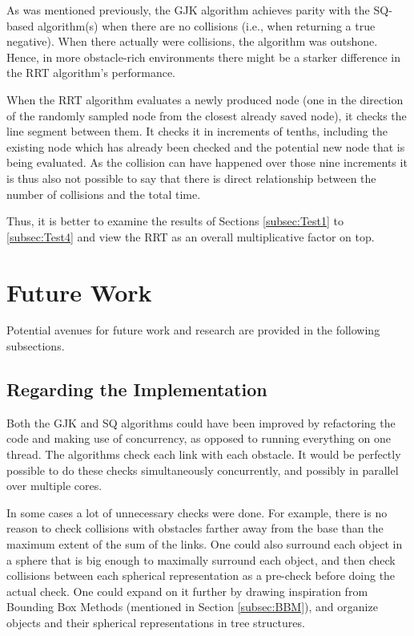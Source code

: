 As was mentioned previously, the \gls{GJK} algorithm achieves parity with the \gls{SQ}-based algorithm(s) when there are no collisions (i.e., when returning a true negative). When there actually were collisions, the algorithm was outshone. Hence, in more obstacle-rich environments there might be a starker difference in the \gls{RRT} algorithm's performance.

When the \gls{RRT} algorithm evaluates a newly produced node (one in the direction of the randomly sampled node from the closest already saved node), it checks the line segment between them. It checks it in increments of tenths, including the existing node which has already been checked and the potential new node that is being evaluated. As the collision can have happened over those nine increments it is thus also not possible to say that there is direct relationship between the number of collisions and the total time.

Thus, it is better to examine the results of Sections \ref{subsec:Test1} to \ref{subsec:Test4} and view the \gls{RRT} as an overall multiplicative factor on top. 
 

\section{Future Work}%

Potential avenues for future work and research are provided in the following subsections.

\subsection{Regarding the Implementation}

Both the \gls{GJK} and \gls{SQ} algorithms could have been improved by refactoring the code and making use of concurrency, as opposed to running everything on one thread. The algorithms check each link with each obstacle. It would be perfectly possible to do these checks simultaneously concurrently, and possibly in parallel over multiple cores.

In some cases a lot of unnecessary checks were done. For example, there is no reason to check collisions with obstacles farther away from the base than the maximum extent of the sum of the links. One could also surround each object in a sphere that is big enough to maximally surround each object, and then check collisions between each spherical representation as a pre-check before doing the actual check. One could expand on it further by drawing inspiration from Bounding Box Methods (mentioned in Section \ref{subsec:BBM}), and organize objects and their spherical representations in tree structures.


